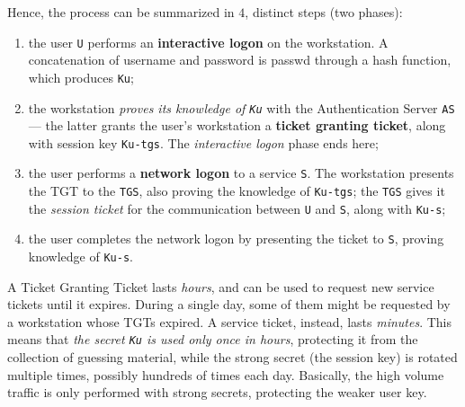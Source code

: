 \documentclass[10pt]{\classname}
\begin{document}
\clearpage


Hence, the process can be summarized in $4$, distinct steps (two phases):
\begin{enumerate}
    \item the user \texttt{U} performs an \textbf{interactive logon} on the
        workstation. A concatenation of username and password is passwd through
        a hash function, which produces \texttt{Ku};
    \item the workstation \emph{proves its knowledge of \texttt{Ku}} with the
        Authentication Server \texttt{AS} --- the latter grants the user's
        workstation a \textbf{ticket granting ticket}, along with session key
        \texttt{Ku-tgs}. The \emph{interactive logon} phase ends here;
    \item the user performs a \textbf{network logon} to a service \texttt{S}.
        The workstation presents the TGT to the \texttt{TGS}, also proving the
        knowledge of \texttt{Ku-tgs}; the \texttt{TGS} gives it the
        \emph{session ticket} for the communication between \texttt{U} and
        \texttt{S}, along with \texttt{Ku-s};
    \item the user completes the network logon by presenting the ticket to
        \texttt{S}, proving knowledge of \texttt{Ku-s}.
\end{enumerate}

A Ticket Granting Ticket lasts \emph{hours}, and can be used to request new
service tickets until it expires. During a single day, some of them might be
requested by a workstation whose TGTs expired. A service ticket, instead, lasts
\emph{minutes}. This means that \emph{the secret \texttt{Ku} is used only once
in hours}, protecting it from the collection of guessing material, while the
strong secret (the session key) is rotated multiple times, possibly hundreds of
times each day. Basically, the high volume traffic is only performed with
strong secrets, protecting the weaker user key.
\end{document}
